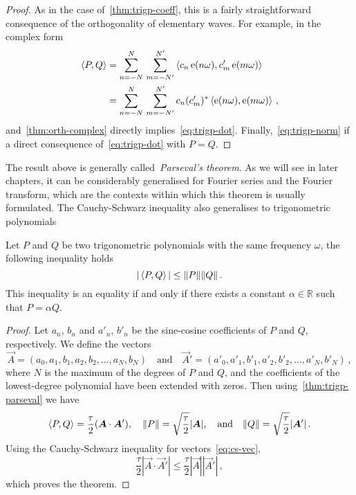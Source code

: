 \begin{proof}
  As in the case of~\cref{thm:trigp-coeff}, this is a fairly straightforward consequence
  of the orthogonality of elementary waves. For example, in the complex form
  \begin{align}
    \braket{P,Q}&=\sum_{n=-N}^N\,\sum_{m=-N'}^{N'}\braket{c_n\operatorname{e}(n\omega),c'_m\operatorname{e}(m\omega)}
    \notag\\
    &=\sum_{n=-N}^N\,\sum_{m=-N'}^{N'}c_n(c'_m)^*\braket{\operatorname{e}(n\omega),\operatorname{e}(m\omega)}\,,
  \end{align}
  and~\cref{thm:orth-complex} directly implies~\cref{eq:trigp-dot}.
  Finally,~\cref{eq:trigp-norm} if a direct consequence of~\cref{eq:trigp-dot} with $P=Q$.
\end{proof}
The result above is generally called~\emph{Parseval's theorem}. As we will see in later
chapters, it can be considerably generalised for Fourier series and the Fourier transform,
which are the contexts within which this theorem is usually formulated. The Cauchy-Schwarz
inequality also generalises to trigonometric polynomials
\begin{theorem}
  Let $P$ and $Q$ be two trigonometric polynomials with the same frequency $\omega$, the
  following inequality holds
  \begin{equation}
    |\braket{P,Q}|\leq\|P\|\|Q\|\,.
  \end{equation}
  This inequality is an equality if and only if there exists a constant
  $\alpha\in\mathbb{R}$ such that $P=\alpha Q$.
\end{theorem}
\begin{proof}
  Let $a_n$, $b_n$ and $a'_n$, $b'_n$ be the sine-cosine coefficients of $P$ and $Q$,
  respectively. We define the vectors
  \begin{equation}
    \vec{A}=(a_0,a_1,b_1,a_2,b_2,\dots,a_N,b_N)\quad\text{and}\quad
    \vec{A}'=(a'_0,a'_1,b'_1,a'_2,b'_2,\dots,a'_N,b'_N)\,,
  \end{equation}
  where $N$ is the maximum of the degrees of $P$ and $Q$, and the coefficients of the
  lowest-degree polynomial have been extended with zeros. Then
  using~\cref{thm:trigp-parseval} we have
  \begin{equation}
    \braket{P,Q}=\frac{\tau}{2}(\bm{A}\cdot\bm{A}'),\quad\|P\|
    =\sqrt{\frac{\tau}{2}}|\bm{A}|,
    \quad\text{and}\quad\|Q\|=\sqrt{\frac{\tau}{2}}|\bm{A}'|\,.
  \end{equation}
  Using the Cauchy-Schwarz inequality for vectors~\cref{eq:cs-vec},
  \begin{equation}
    \frac{\tau}{2}|\vec{A}\cdot\vec{A}'|\leq\frac{\tau}{2}|\vec{A}||\vec{A}'|\,,
  \end{equation}
  which proves the theorem.
\end{proof}

